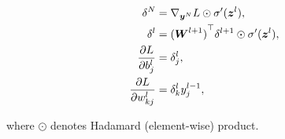 \begin{align}
    \delta^N &= \nabla_{{\boldsymbol{{y}}}^N} L \odot \sigma'({\boldsymbol{{z}}}^l), \\
    \delta^l &= {({\boldsymbol{{W}}}^{l+1})}^{\top} \delta^{l+1} \odot \sigma'({\boldsymbol{{z}}}^l), \\
    \frac{\partial L}{\partial b^l_j} &= \delta^l_j, \\
    \frac{\partial L}{\partial w^l_{kj}} &= \delta^l_k y^{l-1}_j,
\end{align}

where \(\odot\) denotes Hadamard (element-wise) product.







